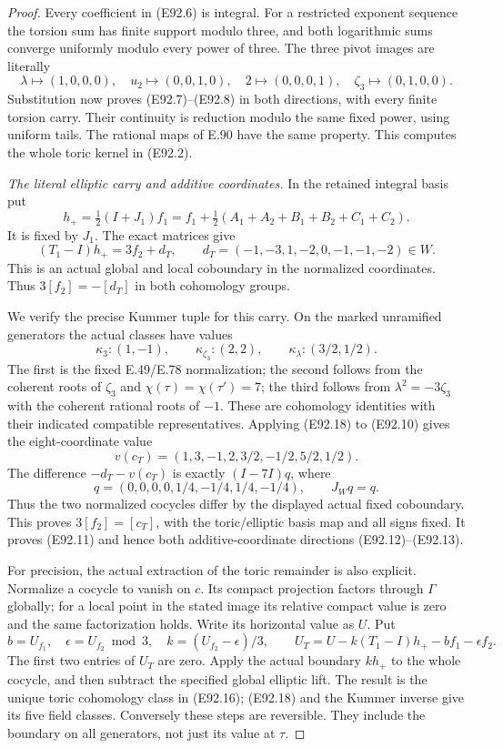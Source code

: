 \begin{proof}
Every coefficient in (E92.6) is integral.
For a restricted exponent sequence the torsion
sum has finite support modulo three, and both
logarithmic sums converge uniformly modulo
every power of three. The three pivot images
are literally
\[
 \lambda\mapsto(1,0,0,0),\quad
 u_2\mapsto(0,0,1,0),\quad
 2\mapsto(0,0,0,1),\quad
 \zeta_3\mapsto(0,1,0,0).
 \tag{E92.21}
\]
Substitution now proves (E92.7)--(E92.8) in
both directions, with every finite torsion
carry. Their continuity is reduction modulo
the same fixed power, using uniform tails.
The rational maps of E.90 have the same
property. This computes the whole toric
kernel in (E92.2).

\emph{The literal elliptic carry and additive coordinates.}
In the retained integral basis put
\[
 h_+=\tfrac12(I+J_1)f_1
   =f_1+\tfrac12(A_1+A_2+B_1+B_2+C_1+C_2).
 \tag{E92.22}
\]
It is fixed by $J_1$. The exact matrices give
\[
 (T_1-I)h_+=3f_2+d_T,
 \qquad
 d_T=(-1,-3,1,-2,0,-1,-1,-2)\in W.
 \tag{E92.23}
\]
This is an actual global and local coboundary
in the normalized coordinates. Thus
$3[f_2]=-[d_T]$ in both cohomology groups.

We verify the precise Kummer tuple for this
carry. On the marked unramified generators
the actual classes have values
\[
 \kappa_3:(1,-1),\qquad
 \kappa_{\zeta_3}:(2,2),\qquad
 \kappa_\lambda:(3/2,1/2).
 \tag{E92.24}
\]
The first is the fixed E.49/E.78 normalization;
the second follows from the coherent roots
of $\zeta_3$ and $\chi(\tau)=\chi(\tau')=7$;
the third follows from $\lambda^2=-3\zeta_3$
with the coherent rational roots of $-1$.
These are cohomology identities with their
indicated compatible representatives.
Applying (E92.18) to (E92.10) gives the
eight-coordinate value
\[
 v(c_T)=(1,3,-1,2,3/2,-1/2,5/2,1/2).
 \tag{E92.25}
\]
The difference $-d_T-v(c_T)$ is exactly
$(I-7I)q$, where
\[
       q=(0,0,0,0,1/4,-1/4,1/4,-1/4),
                         \qquad J_Wq=q.
 \tag{E92.26}
\]
Thus the two normalized cocycles differ by
the displayed actual fixed coboundary.
This proves $3[f_2]=[c_T]$, with the
toric/elliptic basis map and all signs
fixed. It proves (E92.11) and hence both
additive-coordinate directions
(E92.12)--(E92.13).

For precision, the actual extraction of the
toric remainder is also explicit. Normalize
a cocycle to vanish on $c$. Its compact
projection factors through $\Gamma$ globally;
for a local point in the stated image its
relative compact value is zero and the
same factorization holds. Write its
horizontal value as $U$. Put
\[
 b=U_{f_1},\quad \epsilon=U_{f_2}\bmod3,\quad
 k=(U_{f_2}-\epsilon)/3,\qquad
 U_T=U-k(T_1-I)h_+-bf_1-\epsilon f_2.
 \tag{E92.27}
\]
The first two entries of $U_T$ are zero.
Apply the actual boundary $kh_+$ to the
whole cocycle, and then subtract the
specified global elliptic lift. The result
is the unique toric cohomology class in
(E92.16); (E92.18) and the Kummer inverse
give its five field classes. Conversely
these steps are reversible. They include
the boundary on all generators, not just
its value at $\tau$.


\end{proof}
